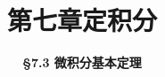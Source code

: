 \everymath{\displaystyle}



\title[第七章\\
定积分]{\texorpdfstring{\LARGE \bfseries 第七章\quad 定积分}{第七章 定积分}} %
\author[\smaller \S 7.3\\
微积分基本定理] %
{\Large \bfseries \S 7.3 微积分基本定理}
\date{}





\begin{frame}

\titlepage %

\end{frame}





